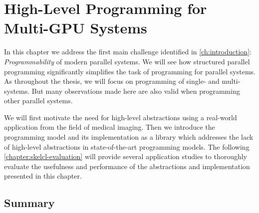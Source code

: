 
\chapter{High-Level Programming for Multi-GPU Systems}

\label{chapter:skelcl}

In this chapter we address the first main challenge identified in \autoref{ch:introduction}: \emph{Programmability} of modern parallel systems.
We will see how structured parallel programming significantly simplifies the task of programming for parallel systems.
As throughout the thesis, we will focus on programming of single- and multi-\GPU systems.
But many observations made here are also valid when programming other parallel systems.

We will first motivate the need for high-level abstractions using a real-world \OpenCL application from the field of medical imaging.
Then we introduce the \emph{\SkelCL} programming model and its implementation as a \Cpp library which addresses the lack of high-level abstractions in state-of-the-art \GPU programming models.
The following \autoref{chapter:skelcl-evaluation} will provide several application studies to thoroughly evaluate the usefulness and performance of the abstractions and implementation presented in this chapter.









\section{Summary}

